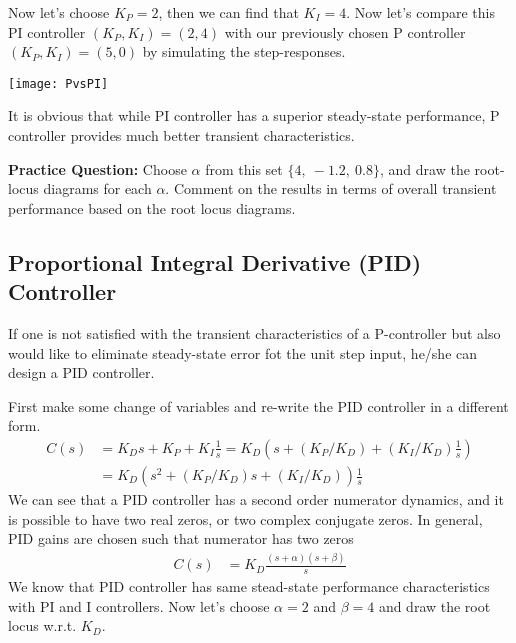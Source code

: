 \documentclass[twoside]{article}
\begin{document}
Now let's choose $K_P = 2$, then we can find that $K_I = 4$.
Now let's compare this PI controller $(K_P , K_I) = (2,4)$ with our
previously chosen P controller $(K_P , K_I) = (5,0)$ by simulating
the step-responses. 

\vspace{12 pt}

  \begin{minipage}[h]{1\linewidth}
    \begin{center}
      \texttt{[image: PvsPI]}
    \end{center}
  \end{minipage}

\vspace{12 pt}

It is obvious that while PI controller has a superior steady-state
performance, P controller provides much better transient
characteristics. 

\textbf{Practice Question:} Choose $\alpha$ from this set  $\lbrace 4,
\ -1.2, \  0.8  \rbrace$, and draw the root-locus diagrams for each
$\alpha$. Comment on the results in terms of overall transient performance
based on the root locus diagrams.

\subsection{Proportional Integral Derivative (PID) Controller}

If one is not satisfied with the transient characteristics of a
P-controller but also would like to eliminate steady-state error
fot the unit step input, he/she can design a PID controller. 

First make some change of variables and re-write the PID controller in a different form.
%
\begin{align*}
 C(s) &= K_D s + K_P + K_I \frac{1}{s} = K_D  \left( s +   (K_P/K_D) +
  (K_I/K_D) \frac{1}{s} \right)\\
&= K_D  \left( s^2 +   (K_P/K_D) s  + (K_I/K_D) \right) \frac{1}{s}
\end{align*}
%
We can see that a PID controller has a second order numerator
dynamics, and it is possible to have two real zeros, or two complex
conjugate zeros. In general, PID gains are chosen such that 
numerator has two zeros
\begin{align*}
 C(s) &= K_D \frac{(s+\alpha) (s + \beta)}{s}
\end{align*}
%
We know that PID controller has same stead-state performance
characteristics with PI and I controllers. Now let's choose $\alpha =
2$ and $\beta = 4$ and draw the root locus w.r.t. $K_D$.
\end{document}
